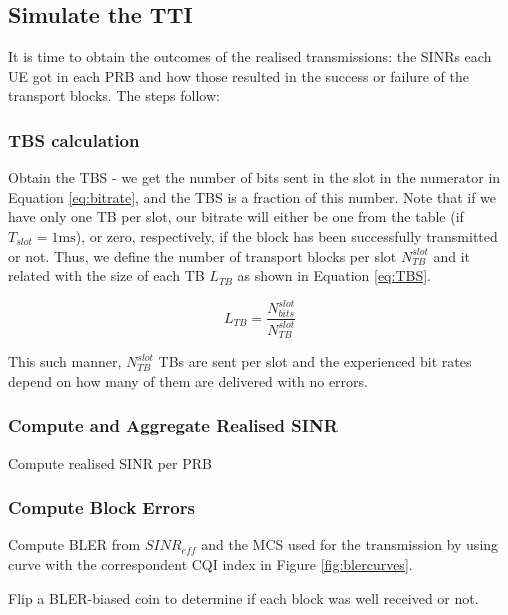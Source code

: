 
\subsection*{Simulate the TTI}

It is time to obtain the outcomes of the realised transmissions: the SINRs each UE got in each PRB and how those resulted in the success or failure of the transport blocks. The steps follow:


\subsubsection*{TBS calculation}

Obtain the \acs{TBS} - we get the number of bits sent in the slot in the numerator in Equation \eqref{eq:bitrate}, and the \ac{TBS} is a fraction of this number. Note that if we have only one \ac{TB} per slot, our bitrate will either be one from the table (if $T_{slot} = 1\text{ms}$), or zero, respectively, if the block has been successfully transmitted or not. Thus, we define the number of transport blocks per slot $N_{TB}^{slot}$ and it related with the size of each \ac{TB} $L_{TB}$ as shown in Equation \eqref{eq:TBS}.


\begin{equation} \label{eq:TBS}
    L_{TB} = \frac{N_{bits}^{slot}}{N_{TB}^{slot}}
\end{equation}

This such manner, $N_{TB}^{slot}$ TBs are sent per slot and the experienced bit rates depend on how many of them are delivered with no errors. 




\subsubsection*{Compute and Aggregate Realised SINR}
Compute realised SINR per PRB

\subsubsection*{Compute Block Errors}

Compute \ac{BLER} from $SINR_{eff}$ and the MCS used for the transmission by using curve with the correspondent CQI index in Figure \ref{fig:blercurves}.

Flip a \acs{BLER}-biased coin to determine if each block was well received or not.
    

